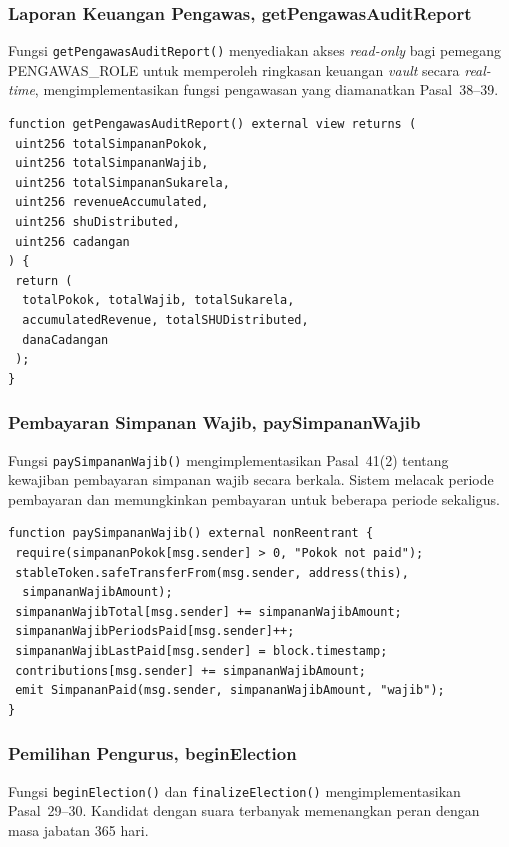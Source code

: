\subsubsection[Laporan Keuangan Pengawas]{Laporan Keuangan Pengawas, getPengawasAuditReport}

Fungsi \texttt{getPengawasAuditReport()} menyediakan akses \textit{read-only} bagi pemegang PENGAWAS\_ROLE untuk memperoleh ringkasan keuangan \textit{vault} secara \textit{real-time}, mengimplementasikan fungsi pengawasan yang diamanatkan Pasal~38--39.

\begin{lstlisting}
function getPengawasAuditReport() external view returns (
 uint256 totalSimpananPokok,
 uint256 totalSimpananWajib,
 uint256 totalSimpananSukarela,
 uint256 revenueAccumulated,
 uint256 shuDistributed,
 uint256 cadangan
) {
 return (
  totalPokok, totalWajib, totalSukarela,
  accumulatedRevenue, totalSHUDistributed,
  danaCadangan
 );
}
\end{lstlisting}

\subsubsection[Pembayaran Simpanan Wajib]{Pembayaran Simpanan Wajib, paySimpananWajib}

Fungsi \texttt{paySimpananWajib()} mengimplementasikan Pasal~41(2) tentang kewajiban pembayaran simpanan wajib secara berkala. Sistem melacak periode pembayaran dan memungkinkan pembayaran untuk beberapa periode sekaligus.

\begin{lstlisting}
function paySimpananWajib() external nonReentrant {
 require(simpananPokok[msg.sender] > 0, "Pokok not paid");
 stableToken.safeTransferFrom(msg.sender, address(this),
  simpananWajibAmount);
 simpananWajibTotal[msg.sender] += simpananWajibAmount;
 simpananWajibPeriodsPaid[msg.sender]++;
 simpananWajibLastPaid[msg.sender] = block.timestamp;
 contributions[msg.sender] += simpananWajibAmount;
 emit SimpananPaid(msg.sender, simpananWajibAmount, "wajib");
}
\end{lstlisting}

\subsubsection[Pemilihan Pengurus]{Pemilihan Pengurus, beginElection}

Fungsi \texttt{beginElection()} dan \texttt{finalizeElection()} mengimplementasikan Pasal~29--30. Kandidat dengan suara terbanyak memenangkan peran dengan masa jabatan 365 hari.

